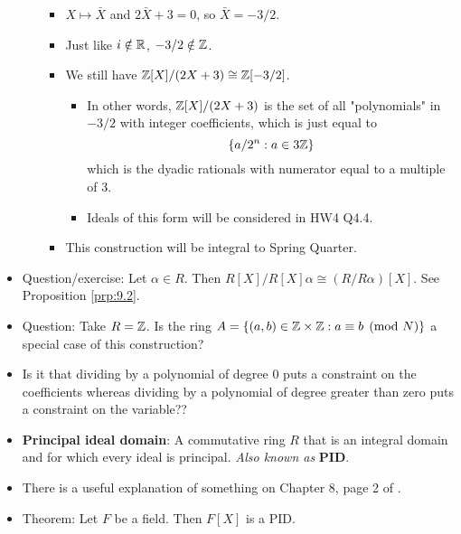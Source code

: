 \documentclass[../notes.tex]{subfiles}
\begin{document}
\begin{itemize}
\begin{enumerate}
\begin{itemize}
            \item $X\mapsto\bar{X}$ and $2\bar{X}+3=0$, so $\bar{X}=-3/2$.
            \item Just like $i\notin\mathbb{R}$, $-3/2\notin\mathbb{Z}$.
            \item We still have $\mathbb{Z}[X]/(2X+3)\cong\mathbb{Z}[-3/2]$.
            \begin{itemize}
                \item In other words, $\mathbb{Z}[X]/(2X+3)$ is the set of all "polynomials" in $-3/2$ with integer coefficients, which is just equal to
                \begin{equation*}
                    \{a/2^n:a\in 3\mathbb{Z}\}
                \end{equation*}
                which is the dyadic rationals with numerator equal to a multiple of 3.
                \item Ideals of this form will be considered in HW4 Q4.4.
            \end{itemize}
            \item This construction will be integral to Spring Quarter.
        \end{itemize}
    \end{enumerate}
    \item Question/exercise: Let $\alpha\in R$. Then $R[X]/R[X]\alpha\cong(R/R\alpha)[X]$. See Proposition \ref{prp:9.2}.
    \item Question: Take $R=\mathbb{Z}$. Is the ring $A=\{(a,b)\in\mathbb{Z}\times\mathbb{Z}:a\equiv b\pmod N\}$ a special case of this construction?
    \item Is it that dividing by a polynomial of degree 0 puts a constraint on the coefficients whereas dividing by a polynomial of degree greater than zero puts a constraint on the variable??
    \item \textbf{Principal ideal domain}: A commutative ring $R$ that is an integral domain and for which every ideal is principal. \emph{Also known as} \textbf{PID}.
    \item There is a useful explanation of something on Chapter 8, page 2 of \textcite{bib:DummitFoote}.
    \item Theorem: Let $F$ be a field. Then $F[X]$ is a PID.

\end{itemize}
\end{document}
